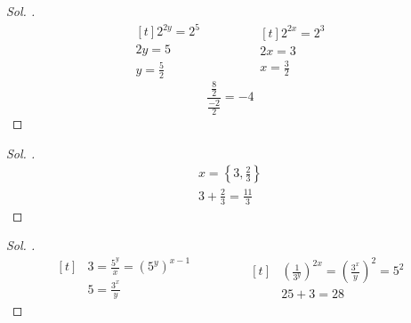 \documentclass{article}
\theoremstyle{mytheoremstyle}
\theoremstyle{mytheoremstyle}
\theoremstyle{myproblemstyle}
\begin{document}
\begin{proof}[\textit{ Sol. }]
  \begin{equation*}
    \begin{aligned}[t]
      2^{2y} = 2^5\\
      2y = 5\\
      y = \frac{5}{2}
    \end{aligned}
    \qquad\qquad
    \begin{aligned}[t]
      2^{2x} = 2^3\\
      2x = 3\\
      x = \frac{3}{2}
    \end{aligned}
  \end{equation*}
  $$ \frac{\frac{8}{2}}{\frac{-2}{2}} = -4 $$
\end{proof}

\begin{problem}[$ (x - 2)^{3x} - 2 = 1 $ ise $ x $ değerleri toplamı?]
\end{problem}

\begin{proof}[\textit{ Sol. }]
  \begin{gather*}
    x = \left\{3, \frac{2}{3}\right\}\\
    3 + \frac{2}{3} = \frac{11}{3}
  \end{gather*}
\end{proof}

\begin{problem}[$ 3^x = 5^y $ olduğuna göre $ \left(\frac{1}{3^y}\right)^{2x} + (5^y)^{\frac{1}{x}} = ? $]
\end{problem}

\begin{proof}[\textit{ Sol. }]
  \begin{equation*}
    \begin{aligned}[t]
      &3 = \frac{5^y}{x} = (5^y)^{x - 1}\\
      &5 = \frac{3^x}{y}
    \end{aligned}
    \qquad\qquad
    \begin{aligned}[t]
      &\left(\frac{1}{3^y}\right)^{2x} = \left(\frac{3^x}{y}\right)^2 = 5^2\\
      &25 + 3 = 28
    \end{aligned}
  \end{equation*}
\end{proof}
\end{document}

